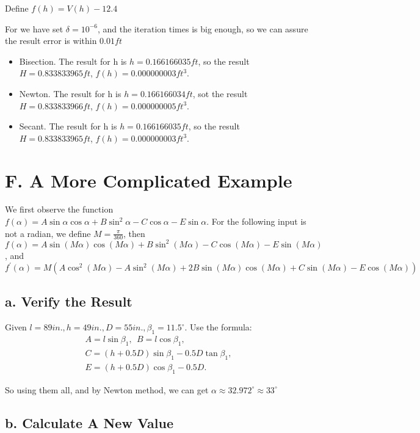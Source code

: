 \documentclass[a4paper]{article}
\begin{document}
Define $f(h) = V(h) - 12.4$

For we have set $\delta = 10^{-6}$, and the iteration times is big enough, so we can assure the result error is within $0.01ft$

\begin{itemize}
	\item Bisection. The result for h is $h = 0.166166035 ft$, so the result $H = 0.833833965 ft$, $f(h) = 0.000000003 ft^3$.
	\item Newton. The result for h is $h = 0.166166034 ft$, sot the result $H = 0.833833966 ft$, $f(h) = 0.000000005 ft^3$.
	\item Secant. The result for h is $h = 0.166166035 ft$, so the result $H = 0.833833965 ft$, $f(h) = 0.000000003 ft^3$.
\end{itemize}


\section*{F. A More Complicated Example}

We first observe the function $f(\alpha) = A \sin\alpha \cos\alpha + B \sin^2\alpha - C\cos\alpha - E\sin\alpha$. For the following input is not a radian, we define $M = \frac{\pi}{360}$, then $f(\alpha) = A \sin(M\alpha) \cos(M\alpha) + B \sin^2(M\alpha) - C\cos(M\alpha) - E\sin(M\alpha)$, and $f^\prime (\alpha) = M (A\cos^2(M\alpha) - A\sin^2(M\alpha) + 2B\sin(M\alpha)\cos(M\alpha) + C\sin(M\alpha) - E\cos(M\alpha))$ 

\subsection*{a. Verify the Result}
\label{subsec::F.a}
Given $l = 89 in., h = 49 in., D = 55in., \beta_1 = 11.5^\circ$. Use the formula:
\begin{equation}
	\begin{aligned}
		A = l \sin\beta_1, ~~ B = l\cos\beta_1, \\
		C = (h+0.5D)\sin\beta_1 - 0.5D\tan\beta_1, \\
		E = (h+0.5D)\cos\beta_1 - 0.5D.
	\end{aligned}
\end{equation}

So using them all, and by Newton method, we can get $\alpha \approx 32.972^\circ \approx 33^\circ$

\subsection*{b. Calculate A New Value}
\end{document}
